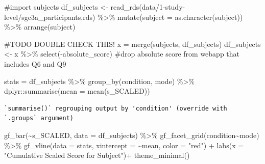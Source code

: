 \documentclass[
  letterpaper,
  DIV=11,
  numbers=noendperiod]{scrreprt}
\newenvironment{Shaded}{\begin{snugshade}}{\end{snugshade}}
\newcommand{\AttributeTok}[1]{\textcolor[rgb]{0.40,0.45,0.13}{#1}}
\newcommand{\CommentTok}[1]{\textcolor[rgb]{0.37,0.37,0.37}{#1}}
\newcommand{\FunctionTok}[1]{\textcolor[rgb]{0.28,0.35,0.67}{#1}}
\newcommand{\NormalTok}[1]{\textcolor[rgb]{0.00,0.23,0.31}{#1}}
\newcommand{\OtherTok}[1]{\textcolor[rgb]{0.00,0.23,0.31}{#1}}
\newcommand{\SpecialCharTok}[1]{\textcolor[rgb]{0.37,0.37,0.37}{#1}}
\newcommand{\StringTok}[1]{\textcolor[rgb]{0.13,0.47,0.30}{#1}}
\begin{document}
\begin{Shaded}
\begin{Highlighting}[]
\CommentTok{\#import subjects}
\NormalTok{df\_subjects }\OtherTok{\textless{}{-}} \FunctionTok{read\_rds}\NormalTok{(}\StringTok{\textquotesingle{}data/1{-}study{-}level/sgc3a\_participants.rds\textquotesingle{}}\NormalTok{) }\SpecialCharTok{\%\textgreater{}\%} \FunctionTok{mutate}\NormalTok{(}\AttributeTok{subject =} \FunctionTok{as.character}\NormalTok{(subject)) }\SpecialCharTok{\%\textgreater{}\%} \FunctionTok{arrange}\NormalTok{(subject)}

\CommentTok{\#TODO DOUBLE CHECK THIS!  }
\NormalTok{x }\OtherTok{=} \FunctionTok{merge}\NormalTok{(subjects, df\_subjects)}
\NormalTok{df\_subjects }\OtherTok{\textless{}{-}}\NormalTok{ x }\SpecialCharTok{\%\textgreater{}\%} \FunctionTok{select}\NormalTok{(}\SpecialCharTok{{-}}\NormalTok{absolute\_score) }\CommentTok{\#drop absolute score from webapp that includes Q6 and Q9}
\end{Highlighting}
\end{Shaded}

\begin{Shaded}
\begin{Highlighting}[]
\NormalTok{stats }\OtherTok{=}\NormalTok{ df\_subjects }\SpecialCharTok{\%\textgreater{}\%} \FunctionTok{group\_by}\NormalTok{(condition, mode) }\SpecialCharTok{\%\textgreater{}\%}\NormalTok{ dplyr}\SpecialCharTok{::}\FunctionTok{summarise}\NormalTok{(}\AttributeTok{mean =} \FunctionTok{mean}\NormalTok{(s\_SCALED))}
\end{Highlighting}
\end{Shaded}

\begin{verbatim}
`summarise()` regrouping output by 'condition' (override with `.groups` argument)
\end{verbatim}

\begin{Shaded}
\begin{Highlighting}[]
\FunctionTok{gf\_bar}\NormalTok{(}\SpecialCharTok{\textasciitilde{}}\NormalTok{s\_SCALED, }\AttributeTok{data =}\NormalTok{ df\_subjects) }\SpecialCharTok{\%\textgreater{}\%} 
  \FunctionTok{gf\_facet\_grid}\NormalTok{(condition}\SpecialCharTok{\textasciitilde{}}\NormalTok{mode) }\SpecialCharTok{\%\textgreater{}\%} 
  \FunctionTok{gf\_vline}\NormalTok{(}\AttributeTok{data =}\NormalTok{ stats, }\AttributeTok{xintercept =} \SpecialCharTok{\textasciitilde{}}\NormalTok{mean, }\AttributeTok{color =} \StringTok{"red"}\NormalTok{) }\SpecialCharTok{+}
  \FunctionTok{labs}\NormalTok{(}\AttributeTok{x =} \StringTok{"Cumulative Scaled Score for Subject"}\NormalTok{)}\SpecialCharTok{+}
  \FunctionTok{theme\_minimal}\NormalTok{()}
\end{Highlighting}
\end{Shaded}
\end{document}
